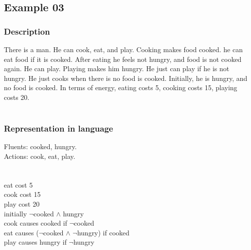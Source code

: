 \documentclass[11pt]{article}
\begin{document}
	\subsection{Example 03}
	\subsubsection{Description}\label{par:p103}
	There is a man. He can cook, eat, and play. Cooking makes food cooked. he can eat food if it is cooked. After eating he feels not hungry, and food is not cooked again. He can play. Playing makes him hungry. He just can play if he is not hungry. He just cooks when there is no food is cooked. Initially, he is hungry, and no food is cooked. In terms of energy, eating costs 5, cooking costs 15, playing costs 20.\\
	\\
	\subsubsection{Representation in language}\label{par:p203}
	Fluents: cooked, hungry.\\
	Actions: cook, eat, play.\\
	\\
	\\
	eat cost 5\\
	cook cost 15\\
	play cost 20\\
	initially $\neg$cooked $\land$ hungry\\
	cook causes cooked if $\neg$cooked\\
	eat causes ($\neg$cooked $\land$ $\neg$hungry) if cooked\\
	play causes hungry if $\neg$hungry\\
	\\
\end{document}
